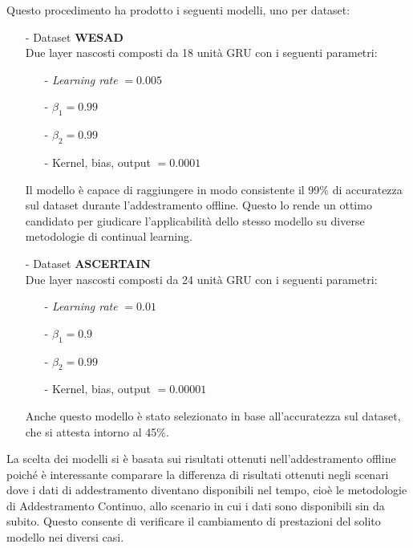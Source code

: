 Questo procedimento ha prodotto i seguenti modelli, uno per dataset:
\begin{itemize}
    \item[-] Dataset \textbf{WESAD}\\
    Due layer nascosti composti da 18 unità GRU con i seguenti parametri:
    \begin{itemize}
        \item[-] \textit{Learning rate} $= 0.005$
        \item[-] $\beta_1 = 0.99$
        \item[-] $\beta_2 = 0.99$
        \item[-] Kernel, bias, output $= 0.0001$
    \end{itemize}
    Il modello è capace di raggiungere in modo consistente il 99\% di accuratezza sul dataset durante l'addestramento offline. Questo lo rende un ottimo candidato per giudicare l'applicabilità dello stesso modello su diverse metodologie di continual learning.
    \item[-] Dataset \textbf{ASCERTAIN}\\
    Due layer nascosti composti da 24 unità GRU con i seguenti parametri:
    \begin{itemize}
        \item[-] \textit{Learning rate} $= 0.01$
        \item[-] $\beta_1 = 0.9$
        \item[-] $\beta_2 = 0.99$
        \item[-] Kernel, bias, output $= 0.00001$
    \end{itemize}
    Anche questo modello è stato selezionato in base all'accuratezza sul dataset, che si attesta intorno al 45\%.
\end{itemize}
La scelta dei modelli si è basata sui risultati ottenuti nell'addestramento offline poiché è interessante comparare la differenza di risultati ottenuti negli scenari dove i dati di addestramento diventano disponibili nel tempo, cioè le metodologie di Addestramento Continuo, allo scenario in cui i dati sono disponibili sin da subito. Questo consente di verificare il cambiamento di prestazioni del solito modello nei diversi casi.
